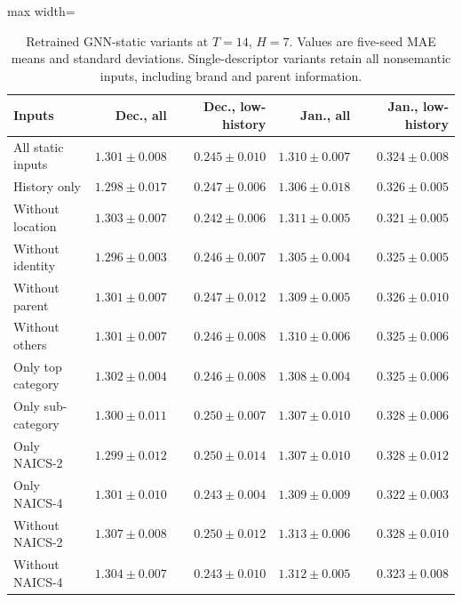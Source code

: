 \begin{table}[!htbp]
\centering
\begingroup
\singlespacing
\fontsize{9pt}{10.5pt}\selectfont
\setlength{\tabcolsep}{4pt}
\renewcommand{\arraystretch}{1.08}
\caption{Retrained GNN-static variants at $T=14$, $H=7$. Values are five-seed MAE means and standard deviations. Single-descriptor variants retain all nonsemantic inputs, including brand and parent information.}
\label{tab:feature_ablations}
\begin{adjustbox}{max width=\linewidth}
\begin{tabular}{lrrrr}
\toprule
Inputs & Dec., all & Dec., low-history & Jan., all & Jan., low-history \\
\midrule
All static inputs & $1.301\pm 0.008$ & $0.245\pm 0.010$ & $1.310\pm 0.007$ & $0.324\pm 0.008$ \\
History only & $1.298\pm 0.017$ & $0.247\pm 0.006$ & $1.306\pm 0.018$ & $0.326\pm 0.005$ \\
Without location & $1.303\pm 0.007$ & $0.242\pm 0.006$ & $1.311\pm 0.005$ & $0.321\pm 0.005$ \\
Without identity & $1.296\pm 0.003$ & $0.246\pm 0.007$ & $1.305\pm 0.004$ & $0.325\pm 0.005$ \\
Without parent & $1.301\pm 0.007$ & $0.247\pm 0.012$ & $1.309\pm 0.005$ & $0.326\pm 0.010$ \\
Without others & $1.301\pm 0.007$ & $0.246\pm 0.008$ & $1.310\pm 0.006$ & $0.325\pm 0.006$ \\
Only top category & $1.302\pm 0.004$ & $0.246\pm 0.008$ & $1.308\pm 0.004$ & $0.325\pm 0.006$ \\
Only sub-category & $1.300\pm 0.011$ & $0.250\pm 0.007$ & $1.307\pm 0.010$ & $0.328\pm 0.006$ \\
Only NAICS-2 & $1.299\pm 0.012$ & $0.250\pm 0.014$ & $1.307\pm 0.010$ & $0.328\pm 0.012$ \\
Only NAICS-4 & $1.301\pm 0.010$ & $0.243\pm 0.004$ & $1.309\pm 0.009$ & $0.322\pm 0.003$ \\
Without NAICS-2 & $1.307\pm 0.008$ & $0.250\pm 0.012$ & $1.313\pm 0.006$ & $0.328\pm 0.010$ \\
Without NAICS-4 & $1.304\pm 0.007$ & $0.243\pm 0.010$ & $1.312\pm 0.005$ & $0.323\pm 0.008$ \\
\bottomrule
\end{tabular}
\end{adjustbox}
\endgroup
\end{table}
